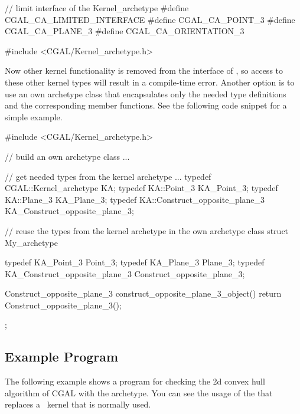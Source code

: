 \ccHtmlLinksOff

\begin{ccExampleCode}
// limit interface of the Kernel_archetype
#define CGAL_CA_LIMITED_INTERFACE
#define CGAL_CA_POINT_3
#define CGAL_CA_PLANE_3
#define CGAL_CA_ORIENTATION_3

#include <CGAL/Kernel_archetype.h>
\end{ccExampleCode}

\ccHtmlLinksOn

Now other kernel functionality is removed from the interface of
, so access to these other kernel types will result
in a compile-time error.
Another option is to use an own archetype class that encapsulates only the 
needed type definitions and the corresponding member functions. 
See the following code snippet for a simple example.

\ccHtmlLinksOff

\begin{ccExampleCode}
#include <CGAL/Kernel_archetype.h>

// build an own archetype class ...

// get needed types from the kernel archetype ...
typedef CGAL::Kernel_archetype           KA;
typedef KA::Point_3                      KA_Point_3;
typedef KA::Plane_3                      KA_Plane_3;
typedef KA::Construct_opposite_plane_3   KA_Construct_opposite_plane_3;

// reuse the types from the kernel archetype in the own archetype class
struct My_archetype {
  typedef KA_Point_3                    Point_3;
  typedef KA_Plane_3                    Plane_3;
  typedef KA_Construct_opposite_plane_3 Construct_opposite_plane_3;
  
  Construct_opposite_plane_3
  construct_opposite_plane_3_object()
  { return Construct_opposite_plane_3(); }
};
\end{ccExampleCode}

\ccHtmlLinksOn

\subsection{Example Program}

The following example shows a program for checking the 2d convex hull algorithm
of CGAL with the archetype. You can see the usage of the
 that replaces a \cgal\ kernel that is normally used.

\ccHtmlLinksOff

